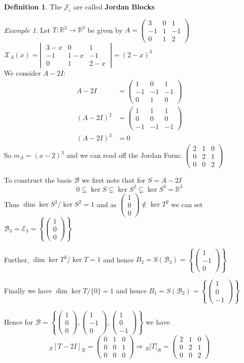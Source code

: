 \documentclass[11pt, a4paper]{report}
\numberwithin{equation}{section}
\renewcommand{\chi}{\mathcal{X}}
\newcommand{\snq}{\subsetneq}
\newcommand{\R}{\mathbb{R}}
\newcommand{\B}{\mathcal{B}}
\newcommand{\nin}{\not\in}
\newcommand{\smp}[1]{\left(\begin{smallmatrix}#1\end{smallmatrix}\right)}
\newcommand{\pmx}[1]{\begin{pmatrix}#1\end{pmatrix}}
\newcommand{\dmx}[1]{\left|\;\begin{matrix}#1\end{matrix}\;\right|}
\numberwithin{equation}{subsection}
\theoremstyle{plain}
\theoremstyle{definition}
\newtheorem{defn}{Definition}[chapter]
\theoremstyle{remark}
\newtheorem{exmp}{Example}[chapter]
\begin{document}
\newpage

\begin{defn} The $\mathcal{J}_i$ are called \textbf{Jordan Blocks} \end{defn}

\begin{exmp}
Let $T: \R^3 \to \R^3$ be given by $A = \smp{3&0&1\\-1&1&-1\\0&1&2}$ \\

$\chi_A (x)	= \dmx{3-x&0&1\\-1&1-x&-1\\0&1&2-x} = (2-x)^3$ \\

We consider $A - 2I$:
\begin{align*}
A - 2I		&= \smp{1&0&1\\-1&-1&-1\\0&1&0} \\
(A-2I)^2 	&= \smp{1&1&1\\0&0&0\\-1&-1&-1} \\
(A-2I)^3	&= 0
\end{align*}
So $m_A = (x - 2)^3$ and we can read off the Jordan Form: $\smp{2&1&0\\0&2&1\\0&0&2}$

To construct the basis $\B$ we first note that for $S = A - 2I$ 
$$0 \snq \ker S \snq \ker S^2 \snq \ker S^3 = \R^3$$
Thus $\dim \ker S^3 / \ker S^2 = 1$ and as $\smp{1\\0\\0} \nin \ker T^2$ we can set $\B_3 = \mathcal{E}_3 = \left\{\smp{1\\0\\0}\right\}$

Further, $\dim \ker T^2 / \ker T = 1$ and hence $B_2 = S(\B_3) = \left\{ \smp{1\\-1\\0} \right\}$

Finally we have $\dim \ker T / \{0\} = 1$ and hence $B_1 = S(\B_2) = \left\{ \smp{1\\0\\-1} \right\}$ 

Hence for $\B = \left\{ \smp{1\\0\\0}, \smp{1\\-1\\0}, \smp{1\\0\\-1} \right\}$ we have
$$_\B[T - 2I]_\B = \pmx{0&1&0\\0&0&1\\0&0&0} \Longrightarrow {_\B[}T]_\B = \pmx{2&1&0\\0&2&1\\0&0&2}$$\\
\end{exmp}
\end{document}
